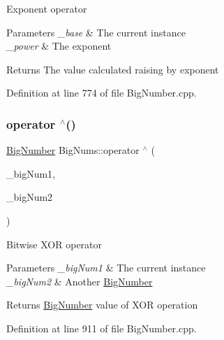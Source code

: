 Exponent operator 
\begin{DoxyParams}{Parameters}
{\em \+\_\+base} & The current instance \\
\hline
{\em \+\_\+power} & The exponent \\
\hline
\end{DoxyParams}
\begin{DoxyReturn}{Returns}
The value calculated raising by exponent 
\end{DoxyReturn}


Definition at line 774 of file Big\+Number.\+cpp.

\mbox{\label{namespace_big_nums_a991aa6b41e534b73bab66446db5909b7}} 
\subsubsection{\texorpdfstring{operator $^\wedge$()}{operator ^()}\hspace{0.1cm}{\footnotesize\ttfamily [2/2]}}
{\footnotesize\ttfamily \mbox{\hyperlink{class_big_nums_1_1_big_number}{Big\+Number}} Big\+Nums\+::operator $^\wedge$ (\begin{DoxyParamCaption}\item[{const \mbox{\hyperlink{class_big_nums_1_1_big_number}{Big\+Number}} \&}]{\+\_\+big\+Num1,  }\item[{const \mbox{\hyperlink{class_big_nums_1_1_big_number}{Big\+Number}} \&}]{\+\_\+big\+Num2 }\end{DoxyParamCaption})}

Bitwise X\+OR operator 
\begin{DoxyParams}{Parameters}
{\em \+\_\+big\+Num1} & The current instance \\
\hline
{\em \+\_\+big\+Num2} & Another \mbox{\hyperlink{class_big_nums_1_1_big_number}{Big\+Number}} \\
\hline
\end{DoxyParams}
\begin{DoxyReturn}{Returns}
\mbox{\hyperlink{class_big_nums_1_1_big_number}{Big\+Number}} value of X\+OR operation 
\end{DoxyReturn}


Definition at line 911 of file Big\+Number.\+cpp.

\mbox{\label{namespace_big_nums_a9bdd811316d31ba358ef97ee09cbb011}} 
